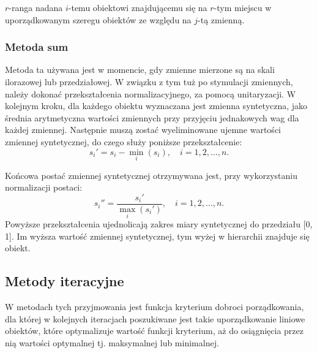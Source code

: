 \documentclass[12pt,a4paper]{report}
\begin{document}
$r$-ranga nadana $i$-temu obiektowi znajdującemu się na $r$-tym miejscu w uporządkowanym
szeregu obiektów ze względu na $j$-tą zmienną.


\subsubsection{Metoda sum}


Metoda ta używana jest w momencie, gdy zmienne mierzone są na skali ilorazowej lub przedziałowej. W związku z tym tuż po stymulacji zmiennych, należy dokonać przekształcenia normalizacyjnego, za pomocą unitaryzacji. W kolejnym kroku, dla każdego obiektu wyznaczana jest zmienna syntetyczna, jako średnia arytmetyczna wartości zmiennych przy przyjęciu jednakowych wag dla każdej zmiennej.
Następnie muszą zostać wyeliminowane ujemne wartości zmiennej syntetycznej, do czego służy poniższe przekształcenie:
$$
s_{i}'=s_{i}-\min\limits_{i}(s_i), \quad i=1, 2, \ldots, n.
$$

Końcowa postać zmiennej syntetycznej otrzymywana jest, przy wykorzystaniu normalizacji postaci: %
$$
s_{i}''=\frac{s_{i}'}{\max\limits_{i}(s_{i}')},\quad i=1, 2, \ldots, n.
$$
Powyższe przekształcenia ujednolicają zakres miary syntetycznej do przedziału [0, 1]. Im wyższa wartość zmiennej syntetycznej, tym wyżej w hierarchii znajduje się obiekt.%


\subsection{Metody iteracyjne}

W metodach tych przyjmowania jest funkcja kryterium dobroci porządkowania, dla której w kolejnych iteracjach poszukiwane jest takie uporządkowanie liniowe obiektów, które optymalizuje wartość funkcji kryterium, aż do osiągnięcia przez nią wartości optymalnej tj. maksymalnej lub minimalnej. 
\end{document}
